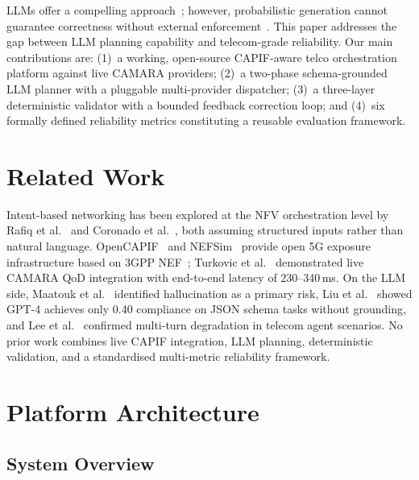 \documentclass[conference]{IEEEtran}
\begin{document}
LLMs offer a compelling approach~\cite{maatouk2025,flowmind2023,yao2023,qin2024};
however, probabilistic generation cannot guarantee correctness without
external enforcement~\cite{liu2024,telagentbench2025}.
This paper addresses the gap between LLM planning capability and
telecom-grade reliability.
Our main contributions are: (1)~a working, open-source CAPIF-aware telco
orchestration platform against live CAMARA providers; (2)~a two-phase
schema-grounded LLM planner with a pluggable multi-provider dispatcher;
(3)~a three-layer deterministic validator with a bounded feedback
correction loop; and (4)~six formally defined reliability metrics
constituting a reusable evaluation framework.

\section{Related Work}
\label{sec:related}

Intent-based networking has been explored at the NFV orchestration level
by Rafiq et al.~\cite{rafiq2020} and Coronado et al.~\cite{coronado2022},
both assuming structured inputs rather than natural language.
OpenCAPIF~\cite{molina2022} and NEFSim~\cite{nefsim2022} provide open
5G exposure infrastructure based on 3GPP NEF~\cite{3gpp_nef}; Turkovic et al.~\cite{turkovic2025} demonstrated
live CAMARA QoD integration with end-to-end latency of 230--340\,ms.
On the LLM side, Maatouk et al.~\cite{maatouk2025} identified hallucination
as a primary risk, Liu et al.~\cite{liu2024} showed GPT-4 achieves only
0.40 compliance on JSON schema tasks without grounding, and
Lee et al.~\cite{telagentbench2025} confirmed multi-turn degradation in
telecom agent scenarios.
No prior work combines live CAPIF integration, LLM planning, deterministic
validation, and a standardised multi-metric reliability framework.

\section{Platform Architecture}
\label{sec:arch}

\subsection{System Overview}
\end{document}
